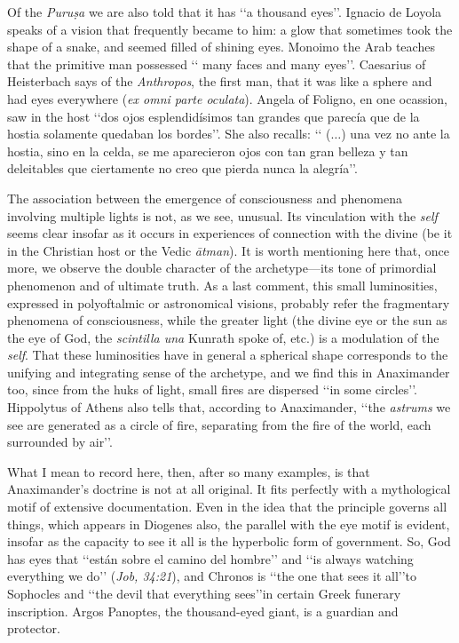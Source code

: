 \documentclass[a4paper]{article}
\begin{document}
Of the \textit{Puruṣa} we are also told that it has \lq\lq a thousand
eyes\rq\rq{}. Ignacio de Loyola speaks of a vision that frequently became to
him: a glow that sometimes took the shape of a snake, and seemed filled of
shining eyes. Monoimo the Arab teaches that the primitive man possessed \lq\lq
many faces and many eyes\rq\rq{}. Caesarius of Heisterbach says of the
\textit{Anthropos}, the first man, that it was like a sphere and had eyes
everywhere (\textit{ex omni parte oculata}). Angela of Foligno, en one ocassion,
saw in the host \lq\lq dos ojos esplendidísimos tan grandes que parecía que de
la hostia solamente quedaban los bordes\rq\rq{}. She also recalls: \lq\lq
($\ldots$) una vez no ante la hostia, sino en la celda, se me aparecieron ojos
con tan gran belleza y tan deleitables que ciertamente no creo que pierda nunca
la alegría\rq\rq{}.

The association between the emergence of consciousness and phenomena involving
multiple lights is not, as we see, unusual. Its vinculation with the
\textit{self} seems clear insofar as it occurs in experiences of connection with
the divine (be it in the Christian host or the Vedic \textit{ātman}). It is
worth mentioning here that, once more, we observe the double character of the
archetype---its tone of primordial phenomenon and of ultimate truth. As a last
comment, this small luminosities, expressed in polyoftalmic or astronomical
visions, probably refer the fragmentary phenomena of consciousness, while the
greater light (the divine eye or the sun as the eye of God, the
\textit{scintilla una} Kunrath spoke of, etc.) is a modulation of the
\textit{self}. That these luminosities have in general a spherical shape
corresponds to the unifying and integrating sense of the archetype, and we find
this in Anaximander too, since from the huks of light, small fires are dispersed
\lq\lq in some circles\rq\rq{}. Hippolytus of Athens also tells that, according
to Anaximander, \lq\lq the \textit{astrums} we see are generated as a circle of
fire, separating from the fire of the world, each surrounded by air\rq\rq{}.

What I mean to record here, then, after so many examples, is that Anaximander's
doctrine is not at all original. It fits perfectly with a mythological motif of
extensive documentation. Even in the idea that the principle governs all things,
which appears in Diogenes also, the parallel with the eye motif is evident,
insofar as the capacity to see it all is the hyperbolic form of government. So,
God has eyes that \lq\lq están sobre el camino del hombre\rq\rq{} and \lq\lq is
always watching everything we do\rq\rq{} (\textit{Job, 34:21}), and Chronos is
\lq\lq the one that sees it all\rq\rq to Sophocles and \lq\lq the devil that
everything sees\rq\rq in certain Greek funerary inscription. Argos Panoptes, the
thousand-eyed giant, is a guardian and protector.
\end{document}
